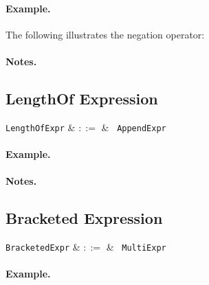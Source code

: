 \paragraph{Example.} The following illustrates the negation operator:



\paragraph{Notes.}


\subsection{LengthOf Expression}
\label{c_expr_lengthof}

\begin{syntax}
\verb+LengthOfExpr+ & $::=$ & \token{|}\ \verb+AppendExpr+\ \token{|}\\
\end{syntax}

\paragraph{Example.}

\paragraph{Notes.}


\subsection{Bracketed Expression}
\label{c_expr_bracketed}

\begin{syntax}
\verb+BracketedExpr+ & $::=$ & \token{(}\ \verb+MultiExpr+\ \token{)}\\
\end{syntax}

\paragraph{Example.}

